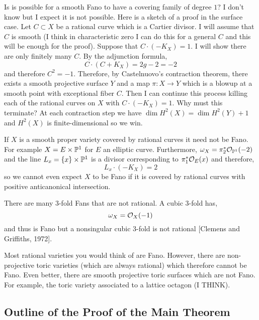 \documentclass[12pt]{article}
\begin{document}
\begin{rmk}
Is is possible for a smooth Fano to have a covering family of degree $1$? I don't know but I expect it is not possible. Here is a sketch of a proof in the surface case. Let $C \subset X$ be a rational curve which is a Cartier divisor. I will assume that $C$ is smooth (I think in characteristic zero I can do this for a general $C$ and this will be enough for the proof). Suppose that $C \cdot (-K_X) = 1$. I will show there are only finitely many $C$. By the adjunction formula,
\[ C \cdot (C + K_X) = 2 g - 2 = -2 \]
and therefore $C^2 = -1$. Therefore, by Castelnuovo's contraction theorem, there exists a smooth projective surface $Y$ and a map $\pi : X \to Y$ which is a blowup at a smooth point with exceptional fiber $C$. Then I can continue this process killing each of the rational curves on $X$ with $C \cdot (-K_X) = 1$. Why must this terminate? At each contraction step we have $\dim{H^2(X)} = \dim{H^2(Y)} + 1$ and $H^2(X)$ is finite-dimensional so we win. 
\end{rmk}

\begin{example}
If $X$ is a smooth proper variety covered by rational curves it need not be Fano. For example $X = E \times \P^1$ for $E$ an elliptic curve. Furthermore, $\omega_X = \pi_2^* \struct{\P^1}(-2)$ and the line $L_x = \{ x \} \times \P^1$ is a divisor corresponding to $\pi_1^* \struct{E}(x)$ and therefore,
\[ L_x \cdot (-K_X) = 2 \]
so we cannot even expect $X$ to be Fano if it is covered by rational curves with positive anticanonical intersection. 
\end{example}

\begin{example}
There are many $3$-fold Fans that are not rational. A cubic $3$-fold has,
\[ \omega_X = \struct{X}(-1) \]
and thus is Fano but a nonsingular cubic $3$-fold is not rational [Clemens and Griffiths, 1972].
\end{example}

\begin{example}
Most rational varieties you would think of are Fano. However, there are non-projective toric varieties (which are always rational) which therefore cannot be Fano. Even better, there are smooth projective toric surfaces which are not Fano. For example, the toric variety associated to a lattice octagon (I THINK). 
\end{example}

\subsection{Outline of the Proof of the Main Theorem}
\end{document}
